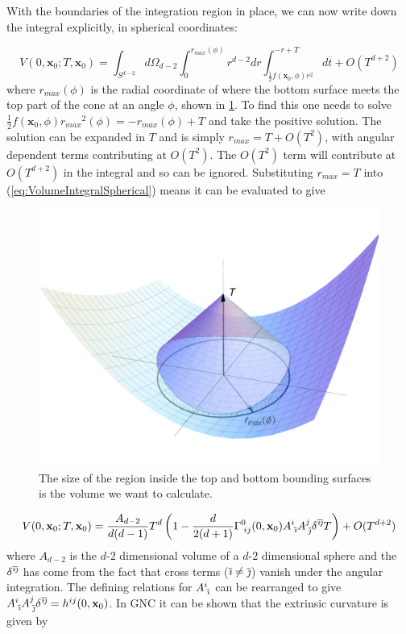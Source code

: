 \documentclass[12pt]{article}
\newcommand{\be}{\begin{equation}}
\newcommand{\ee}{\end{equation}}
\begin{document}
With the boundaries of the integration region in place, we can now write down the integral explicitly, in spherical coordinates:

\be\label{eq:VolumeIntegralSpherical}
V(0,\mathbf{x}_0;T,\mathbf{x}_0)=\int_{S^{d-2}}
d\Omega_{d-2}
\int_{0}^{r_{max}(\phi)}r^{d-2}dr
\int_{\frac{1}{2}f(\mathbf{x}_0,\phi)r^2}^{-r+T}
d\overline{t}+O(T^{d+2})
\ee
where $r_{max}(\phi)$ is the radial coordinate of where the bottom surface meets the top part of the cone at an angle $\phi$, shown in \ref{fig:cone_plot}. To find this one needs to solve $\frac{1}{2}f(\mathbf{x}_0,\phi){r_{max}}^2(\phi)=-r_{max}(\phi)+T$ and take the positive solution. The solution can be expanded in $T$ and is simply $r_{max}=T+O(T^2)$, with angular dependent terms contributing at $O(T^2)$. The $O(T^2)$ term will contribute at $O(T^{d+2})$ in the integral and so can be ignored. Substituting $r_{max}=T$ into (\ref{eq:VolumeIntegralSpherical}) means it can be evaluated to give
\begin{figure}[t]
  \centering
    \includegraphics[scale=0.5]{coneplot}
     \caption{The size of the region inside the top and bottom bounding surfaces is the volume we want to calculate.}
     \label{fig:cone_plot}
\end{figure}
\be\label{eq:VolumeNoK}
V(0,\mathbf{x}_0;T,\mathbf{x}_0)
=\frac{A_{d-2}}{d(d-1)}T^d\left(1-\frac{d}{2(d+1)}\Gamma^{0}_{\;ij}(0,\mathbf{x}_0)A^{i}_{\;\overline{\emph\i}}A^{j}_{\;\overline{\emph\j}}\delta^{\overline{\emph\i}\overline{\emph\j}}T\right)
+O(T^{d+2})
\ee
where $A_{d-2}$ is the $d$-$2$ dimensional volume of a $d$-$2$ dimensional sphere and the $\delta^{\overline{\emph\i}\overline{\emph\j}}$ has come from the fact that cross terms ($\overline{\emph\i}\neq \overline{\emph\j}$) vanish under the angular integration. The defining relations for $A^{i}_{\;\overline{\emph\i}}$ can be rearranged to give $A^{i}_{\;\overline{\emph\i}}A^{j}_{\;\overline{\emph\j}}\delta^{\overline{\emph\i}\overline{\emph\j}}=h^{ij}(0,\mathbf{x}_0)$. In GNC it can be shown that the extrinsic curvature is given by
\end{document}
